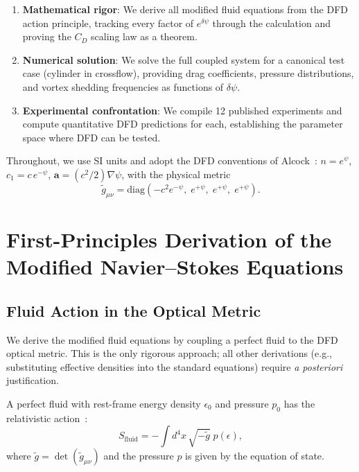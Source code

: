 \documentclass[12pt,twocolumn]{article}
\newcommand{\avec}{\mathbf{a}}
\newcommand{\dpsi}{\delta\psi}
\begin{document}
\begin{enumerate}[noitemsep]
\item \textbf{Mathematical rigor}: We derive all modified fluid equations from
  the DFD action principle, tracking every factor of $e^{\dpsi}$ through the
  calculation and proving the $C_D$ scaling law as a theorem.
\item \textbf{Numerical solution}: We solve the full coupled system for a
  canonical test case (cylinder in crossflow), providing drag coefficients,
  pressure distributions, and vortex shedding frequencies as functions of
  $\dpsi$.
\item \textbf{Experimental confrontation}: We compile 12 published experiments
  and compute quantitative DFD predictions for each, establishing the
  parameter space where DFD can be tested.
\end{enumerate}

Throughout, we use SI units and adopt the DFD conventions of
Alcock~\cite{alcock2026dfd}: $n = e^\psi$, $c_1 = c\,e^{-\psi}$,
$\avec = (c^2/2)\nabla\psi$, with the physical metric
\begin{equation}
\tilde{g}_{\mu\nu} = \mathrm{diag}\!\left(-c^2 e^{-\psi},\;
e^{+\psi},\; e^{+\psi},\; e^{+\psi}\right).
\label{eq:physical_metric}
\end{equation}

\section{First-Principles Derivation of the Modified Navier--Stokes Equations}
\label{sec:derivation}

\subsection{Fluid Action in the Optical Metric}
\label{sec:fluid_action}

We derive the modified fluid equations by coupling a perfect fluid to the DFD
optical metric. This is the only rigorous approach; all other derivations
(e.g., substituting effective densities into the standard equations) require
\emph{a posteriori} justification.

A perfect fluid with rest-frame energy density $\epsilon_0$ and pressure $p_0$
has the relativistic action~\cite{schutz1970,brown1993}:
\begin{equation}
S_\mathrm{fluid} = -\int d^4x\,\sqrt{-\tilde{g}}\;p(\epsilon),
\label{eq:fluid_action}
\end{equation}
where $\tilde{g} = \det(\tilde{g}_{\mu\nu})$ and the pressure $p$ is given by
the equation of state.
\end{document}
